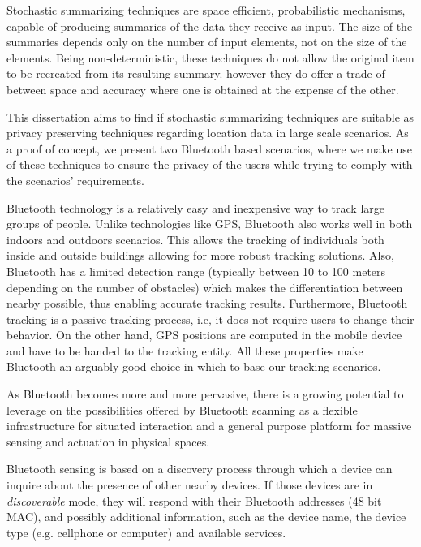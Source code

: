 Stochastic summarizing techniques are space efficient, probabilistic
mechanisms, capable of producing summaries of the data they receive as
input.  The size of the summaries depends only on the number of input
elements, not on the size of the elements. Being non-deterministic,
these techniques do not allow the original item to be recreated from
its resulting summary. however they do offer a trade-of between space
and accuracy where one is obtained at the expense of the other.


This dissertation aims to find if stochastic summarizing techniques
are suitable as privacy preserving techniques regarding location
data in large scale scenarios. As a proof of concept, we present two
Bluetooth based scenarios, where we make use of these techniques
to ensure the privacy of the users while trying to comply with the
scenarios' requirements.

Bluetooth technology is a relatively easy and inexpensive way to track
large groups of people. Unlike technologies like GPS, Bluetooth also
works well in both indoors and outdoors scenarios. This allows the
tracking of individuals both inside and outside buildings allowing for
more robust tracking solutions.  Also, Bluetooth has a limited
detection range (typically between 10 to 100 meters depending on the
number of obstacles) which makes the differentiation between nearby
possible, thus enabling accurate tracking results. Furthermore,
Bluetooth tracking is a passive tracking process, i.e, it does not
require users to change their behavior. On the other hand, GPS
positions are computed in the mobile device and have to be handed to
the tracking entity.  All these properties make Bluetooth an arguably
good choice in which to base our tracking scenarios.

As Bluetooth becomes more and more pervasive, there is a growing
potential to leverage on the possibilities offered by Bluetooth
scanning as a flexible infrastructure for situated interaction and a
general purpose platform for massive sensing and actuation in physical
spaces.

Bluetooth sensing is based on a discovery process through
which a device can inquire about the presence of other nearby devices.
If those devices are in \emph{discoverable} mode, they will respond
with their Bluetooth addresses (48 bit MAC), and possibly additional
information, such as the device name, the device type (e.g. cellphone
or computer) and available services.

